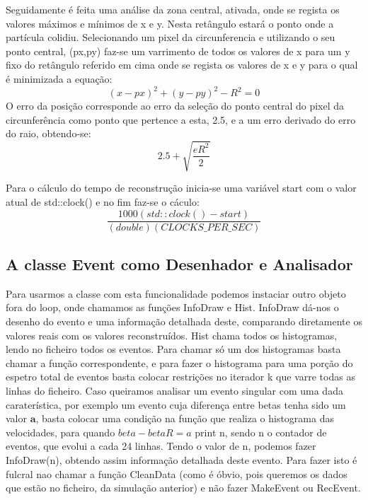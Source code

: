 \documentclass{article}
\begin{document}
\begin{multicols}{2}
Seguidamente é feita uma análise da zona central, ativada, onde se regista os valores máximos e mínimos de x e y. Nesta retângulo estará o ponto onde a partícula colidiu. Selecionando um pixel da circunferencia e utilizando o seu ponto central, (px,py) faz-se um varrimento de todos os valores de x para um y fixo do retângulo referido em cima onde se regista os valores de x e y para o qual é minimizada a equação:
\begin{equation}
(x-px)^2+(y-py)^2-R^2=0
\end{equation}
O erro da posição corresponde ao erro da seleção do ponto central do pixel da circunferência como ponto que pertence a esta, 2.5, e a um erro derivado do erro do raio, obtendo-se:
\begin{equation}
2.5+\sqrt{\frac{eR^2}{2}}
\end{equation}

Para o cálculo do tempo de reconstrução inicia-se uma variável start com o valor atual de std::clock() e no fim faz-se o cáculo: 
\begin{equation}
\frac{1000(std::clock() - start)}{(double)(CLOCKS\_ PER\_SEC)}
\end{equation}

\subsection{A classe Event como Desenhador e Analisador}
Para usarmos a classe com esta funcionalidade podemos instaciar outro objeto fora do loop, onde chamamos as funções InfoDraw e Hist. InfoDraw dá-nos o desenho do evento e uma informação detalhada deste, comparando diretamente os valores reais com os valores reconstruídos. Hist chama todos os histogramas, lendo no ficheiro todos os eventos. Para chamar só um dos histogramas basta chamar a função correspondente, e para fazer o histograma para uma porção do espetro total de eventos basta colocar restrições no iterador k que varre todas as linhas do ficheiro.
Caso queiramos analisar um evento singular com uma dada caraterística, por exemplo um evento cuja diferença entre betas tenha sido um valor $\textbf{a}$, basta colocar uma condição na função que realiza o histograma das velocidades, para quando $beta-betaR=a$ print n, sendo n o contador de eventos, que evolui a cada 24 linhas. Tendo o valor de n, podemos fazer InfoDraw(n), obtendo assim informação detalhada deste evento. Para fazer isto é fulcral nao chamar a função CleanData (como é óbvio, pois queremos os dados que estão no ficheiro, da simulação anterior) e não fazer MakeEvent ou RecEvent.

\end{multicols}
\end{document}
